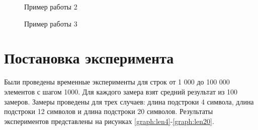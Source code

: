 \documentclass[a4paper,12pt]{report}
\begin{document}
		\begin{figure}[h!]
			\caption{Пример работы 2}
			\label{ris:test2}
		\end{figure}
	
		\newpage
	
		\begin{figure}[h!]
			\caption{Пример работы 3}
			\label{ris:test3}
		\end{figure}
        
    \section{Постановка эксперимента} 

		Были проведены временные эксперименты для строк  от 1 000 до 100 000 элементов с шагом 1000. 
		Для каждого замера взят средний результат из 100 замеров.  
		Замеры проведены для трех случаев: длина подстроки 4 символа, длина подстроки 12 символов и длина подстроки 20 символов. 
		Результаты экспериментов представлены на рисунках \ref{graph:len4}-\ref{graph:len20}.
\end{document}
